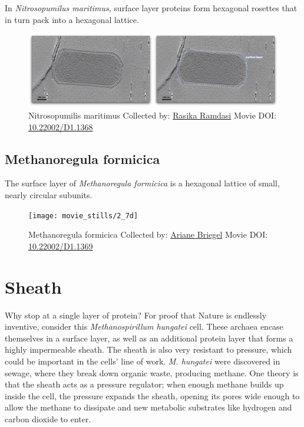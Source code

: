\documentclass[]{tufte-book}
\begin{document}
In \emph{Nitrosopumilus maritimus}, surface layer proteins form
hexagonal rosettes that in turn pack into a hexagonal lattice.





\begin{figure}
\includegraphics{movie_stills/2_7c} \caption[Nitrosopumilis maritimus Collected by:
\protect\hyperlink{rasika_ramdasi}{Rasika Ramdasi} Movie DOI:
\href{https://doi.org/10.22002/D1.1368}{10.22002/D1.1368}]{Nitrosopumilis maritimus Collected by:
\protect\hyperlink{rasika_ramdasi}{Rasika Ramdasi} Movie DOI:
\href{https://doi.org/10.22002/D1.1368}{10.22002/D1.1368}}\label{fig:2-7c}
\end{figure}

\hypertarget{Methanoregula_formicica}{\subsection{Methanoregula
formicica}\label{Methanoregula_formicica}}

The surface layer of \emph{Methanoregula formicica} is a hexagonal
lattice of small, nearly circular subunits.





\begin{figure}
\texttt{[image: movie\_stills/2\_7d]} \caption[Methanoregula formicica Collected by:
\protect\hyperlink{ariane_briegel}{Ariane Briegel} Movie DOI:
\href{https://doi.org/10.22002/D1.1369}{10.22002/D1.1369}]{Methanoregula formicica Collected by:
\protect\hyperlink{ariane_briegel}{Ariane Briegel} Movie DOI:
\href{https://doi.org/10.22002/D1.1369}{10.22002/D1.1369}}\label{fig:2-7d}
\end{figure}

\section{Sheath}\label{sheath}

Why stop at a single layer of protein? For proof that Nature is
endlessly inventive, consider this \emph{Methanospirillum hungatei}
cell. These archaea encase themselves in a surface layer, as well as an
additional protein layer that forms a highly impermeable sheath. The
sheath is also very resistant to pressure, which could be important in
the cells' line of work. \emph{M. hungatei} were discovered in sewage,
where they break down organic waste, producing methane. One theory is
that the sheath acts as a pressure regulator; when enough methane builds
up inside the cell, the pressure expands the sheath, opening its pores
wide enough to allow the methane to dissipate and new metabolic
substrates like hydrogen and carbon dioxide to enter.
\end{document}
